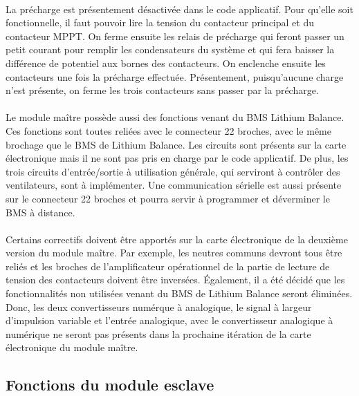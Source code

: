 		\paragraph{}
		La précharge est présentement désactivée dans le code applicatif. Pour qu'elle soit fonctionnelle, il faut pouvoir lire la tension du contacteur principal et du contacteur MPPT. On ferme ensuite les relais de précharge qui feront passer un petit courant pour remplir les condensateurs du système et qui fera baisser la différence de potentiel aux bornes des contacteurs. On enclenche ensuite les contacteurs une fois la précharge effectuée. Présentement, puisqu'aucune charge n'est présente, on ferme les trois contacteurs sans passer par la précharge.

		\paragraph{}
		Le module maître possède aussi des fonctions venant du BMS Lithium Balance. Ces fonctions sont toutes reliées avec le connecteur 22 broches, avec le même brochage que le BMS de Lithium Balance. Les circuits sont présents sur la carte électronique mais il ne sont pas pris en charge par le code applicatif. De plus, les trois circuits d'entrée/sortie à utilisation générale, qui serviront à contrôler des ventilateurs, sont à implémenter. Une communication sérielle est aussi présente sur le connecteur 22 broches et pourra servir à programmer et déverminer le BMS à distance.

		\paragraph{}
		Certains correctifs doivent être apportés sur la carte électronique de la deuxième version du module maître. Par exemple, les neutres communs devront tous être reliés et les broches de l'amplificateur opérationnel de la partie de lecture de tension des contacteurs doivent être inversées. Également, il a été décidé que les fonctionnalités non utilisées venant du BMS de Lithium Balance seront éliminées. Donc, les deux convertisseurs numérque à analogique, le signal à largeur d'impulsion variable et l'entrée analogique, avec le convertisseur analogique à numérique ne seront pas présents dans la prochaine itération de la carte électronique du module maître.

	\subsection{Fonctions du module esclave}

